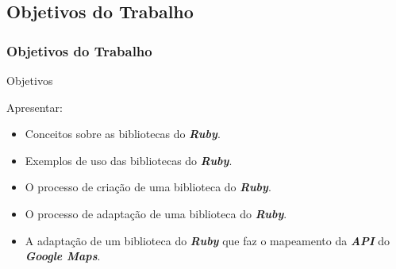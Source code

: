  \subsection{Objetivos do Trabalho}
 \begin{frame}
  \frametitle{Objetivos do Trabalho}

  \begin{block}{Objetivos}

   Apresentar:

   \begin{itemize}

    \item  Conceitos sobre as bibliotecas do \emph{\textbf{Ruby}}.

    \item  Exemplos de uso das bibliotecas do \emph{\textbf{Ruby}}.    
    
    \item  O processo de criação de uma biblioteca do \emph{\textbf{Ruby}}.

    \item  O processo de adaptação de uma biblioteca do \emph{\textbf{Ruby}}.
    
    \item  A adaptação de um biblioteca do \emph{\textbf{Ruby}} que faz o mapeamento
    da \emph{\textbf{API}} do \emph{\textbf{Google Maps}}.

   \end{itemize}

  \end{block}

\end{frame}